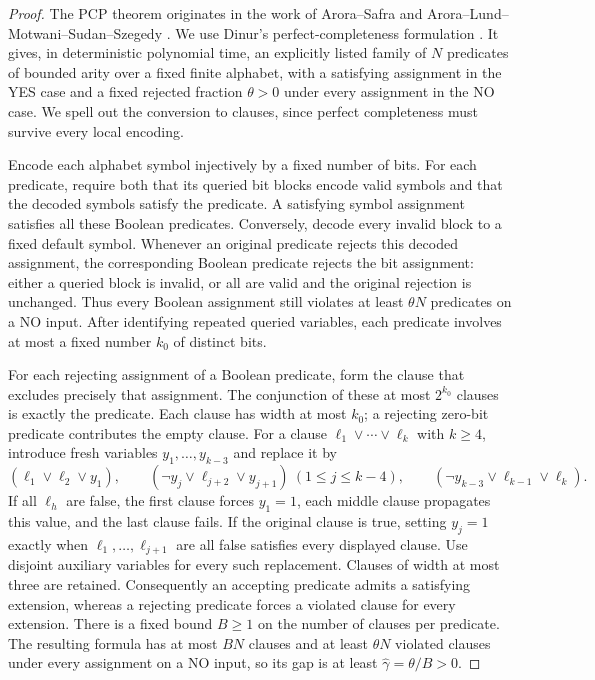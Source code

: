 \begin{proof}
The PCP theorem originates in the work of Arora--Safra and
Arora--Lund--Motwani--Sudan--Szegedy
\cite{AroraSafra1998,AroraLundMotwaniSudanSzegedy1998}.
We use Dinur's perfect-completeness formulation
\cite[Definition~8.1 and Theorem~8.1, February 13, 2007 author manuscript]{Dinur2007}.
It gives, in deterministic polynomial time, an explicitly listed family of
$N$ predicates of bounded arity over a fixed finite alphabet, with a
satisfying assignment in the YES case and a fixed rejected fraction
$\theta>0$ under every assignment in the NO case.
We spell out the conversion to clauses, since perfect completeness must
survive every local encoding.

Encode each alphabet symbol injectively by a fixed number of bits.  For
each predicate, require both that its queried bit blocks encode valid
symbols and that the decoded symbols satisfy the predicate.  A satisfying
symbol assignment satisfies all these Boolean predicates.  Conversely,
decode every invalid block to a fixed default symbol.  Whenever an original
predicate rejects this decoded assignment, the corresponding Boolean
predicate rejects the bit assignment: either a queried block is invalid,
or all are valid and the original rejection is unchanged.  Thus every
Boolean assignment still violates at least $\theta N$ predicates on a
NO input.  After identifying repeated queried variables, each predicate
involves at most a fixed number $k_0$ of distinct bits.

For each rejecting assignment of a Boolean predicate, form the clause that
excludes precisely that assignment.  The conjunction of these at most
$2^{k_0}$ clauses is exactly the predicate.  Each clause has width at most
$k_0$; a rejecting zero-bit predicate contributes the empty clause.
For a clause $\ell_1\vee\cdots\vee\ell_k$ with $k\ge4$, introduce fresh
variables $y_1,\ldots,y_{k-3}$ and replace it by
\[
 (\ell_1\vee\ell_2\vee y_1),\qquad
 (\neg y_j\vee\ell_{j+2}\vee y_{j+1})\ (1\le j\le k-4),\qquad
 (\neg y_{k-3}\vee\ell_{k-1}\vee\ell_k).
\]
If all $\ell_h$ are false, the first clause forces $y_1=1$, each middle
clause propagates this value, and the last clause fails.  If the original
clause is true, setting $y_j=1$ exactly when
$\ell_1,\ldots,\ell_{j+1}$ are all false satisfies every displayed clause.
Use disjoint auxiliary variables for every such replacement.  Clauses of
width at most three are retained.  Consequently an accepting predicate
admits a satisfying extension, whereas a rejecting predicate forces a
violated clause for every extension.  There is a fixed bound $B\ge1$ on
the number of clauses per predicate.  The resulting formula has at most
$BN$ clauses and at least $\theta N$ violated clauses under every assignment
on a NO input, so its gap is at least $\widehat\gamma=\theta/B>0$.


\end{proof}
